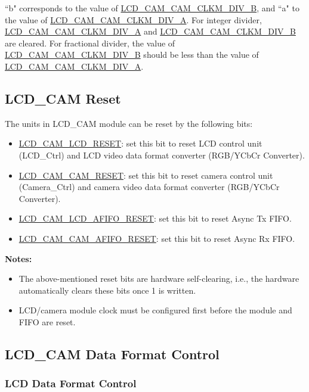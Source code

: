 \documentclass[main\_\_EN.tex]{subfiles}
\begin{document}
``b" corresponds to the value of  \hyperref[fielddesc:LCDCAMCAMCLKMDIVB]{LCD\_CAM\_CAM\_CLKM\_DIV\_B}, and ``a" to the value of  \hyperref[fielddesc:LCDCAMCAMCLKMDIVA]{LCD\_CAM\_CAM\_CLKM\_DIV\_A}. For integer divider, \hyperref[fielddesc:LCDCAMCAMCLKMDIVA]{LCD\_CAM\_CAM\_CLKM\_DIV\_A} and  \hyperref[fielddesc:LCDCAMCAMCLKMDIVB]{LCD\_CAM\_CAM\_CLKM\_DIV\_B} are cleared. For fractional divider, the value of \hyperref[fielddesc:LCDCAMCAMCLKMDIVB]{LCD\_CAM\_CAM\_CLKM\_DIV\_B} should be less than the value of  \hyperref[fielddesc:LCDCAMCAMCLKMDIVA]{LCD\_CAM\_CAM\_CLKM\_DIV\_A}.



\subsection{LCD\_CAM Reset} \label{module_reset}
The units in LCD\_CAM module can be reset by the following bits:
\begin{itemize}
\item \hyperref[fielddesc:LCDCAMLCDRESET]{LCD\_CAM\_LCD\_RESET}: set this bit to reset LCD control unit (LCD\_Ctrl) and LCD video data format converter (RGB/YCbCr Converter).
\item \hyperref[fielddesc:LCDCAMCAMRESET]{LCD\_CAM\_CAM\_RESET}: set this bit to reset camera control unit (Camera\_Ctrl) and camera video data format converter (RGB/YCbCr Converter).
\item \hyperref[fielddesc:LCDCAMLCDAFIFORESET]{LCD\_CAM\_LCD\_AFIFO\_RESET}: set this bit to reset Async Tx FIFO.
\item \hyperref[fielddesc:LCDCAMCAMAFIFORESET]{LCD\_CAM\_CAM\_AFIFO\_RESET}: set this bit to reset Async Rx FIFO.
\end{itemize}


{\bfseries Notes: }
\begin{itemize}
    \item The above-mentioned reset bits are hardware self-clearing, i.e., the hardware automatically clears these bits once 1 is written.
    \item LCD/camera module clock must be configured first before the module and FIFO are reset.
\end{itemize}

\subsection{LCD\_CAM Data Format Control}
\subsubsection{LCD Data Format Control} \label{lcd_data_control}
\end{document}
